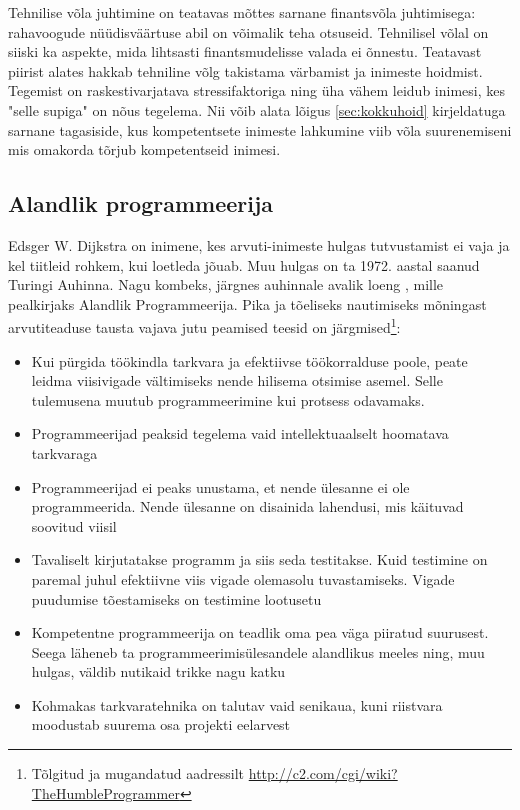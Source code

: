 \documentclass{article}
\begin{document}
Tehnilise võla juhtimine on teatavas mõttes sarnane finantsvõla juhtimisega: rahavoogude nüüdisväärtuse abil on võimalik teha otsuseid. Tehnilisel võlal on siiski ka aspekte, mida lihtsasti finantsmudelisse valada ei õnnestu. Teatavast piirist alates hakkab tehniline võlg takistama värbamist ja inimeste hoidmist. Tegemist on raskestivarjatava stressifaktoriga ning üha vähem leidub inimesi, kes "selle supiga" on nõus tegelema. Nii võib alata lõigus \ref{sec:kokkuhoid} kirjeldatuga sarnane tagasiside, kus kompetentsete inimeste lahkumine viib võla suurenemiseni mis omakorda tõrjub kompetentseid inimesi. 

\subsection{Alandlik programmeerija}
\label{humble}
Edsger W. Dijkstra on inimene, kes arvuti-inimeste hulgas tutvustamist ei vaja ja kel tiitleid rohkem, kui loetleda jõuab. Muu hulgas on ta 1972. aastal saanud Turingi Auhinna. Nagu kombeks, järgnes auhinnale avalik loeng \citep{yourdon1979classics}, mille pealkirjaks Alandlik Programmeerija. Pika ja tõeliseks nautimiseks mõningast arvutiteaduse tausta vajava jutu peamised teesid on järgmised\footnote{Tõlgitud ja mugandatud aadressilt \url{http://c2.com/cgi/wiki?TheHumbleProgrammer}}:
\begin{itemize}
	\item Kui pürgida töökindla tarkvara ja efektiivse töökorralduse poole, peate leidma viisivigade vältimiseks nende hilisema otsimise asemel. Selle tulemusena muutub programmeerimine kui protsess odavamaks.
	\item Programmeerijad peaksid tegelema vaid intellektuaalselt hoomatava tarkvaraga
	\item Programmeerijad ei peaks unustama, et nende ülesanne ei ole programmeerida. Nende ülesanne on disainida lahendusi, mis käituvad soovitud viisil
	\item Tavaliselt kirjutatakse programm ja siis seda testitakse. Kuid testimine on paremal juhul efektiivne viis vigade olemasolu tuvastamiseks. Vigade puudumise  tõestamiseks on testimine lootusetu
	\item Kompetentne programmeerija on teadlik oma pea väga piiratud suurusest. Seega läheneb ta programmeerimisülesandele alandlikus meeles ning, muu hulgas, väldib nutikaid trikke nagu katku
	\item Kohmakas tarkvaratehnika on talutav vaid senikaua, kuni riistvara moodustab suurema osa projekti eelarvest
\end{itemize}
\end{document}

